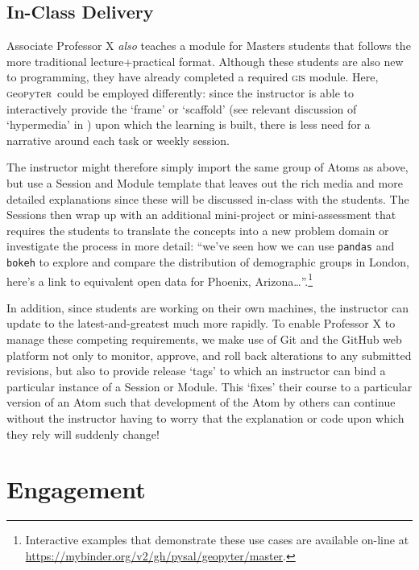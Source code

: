 \documentclass[letter, 11pt,titlepage]{article}
\newcommand{\gp}{\textsc{g}eo\textsc{p}y\textsc{t}e\textsc{r}~\/}
\begin{document}
\subsection{In-Class Delivery}\label{in-class-delivery}

Associate Professor X \emph{also} teaches a module for Masters students that follows the more traditional lecture+practical format. Although these students are also new to programming, they have already completed a required \textsc{gis} module. Here, \gp could be employed differently: since the instructor is able to interactively provide the `frame' or `scaffold' (see relevant discussion of `hypermedia' in \citealp{Azevedo2008}) upon which the learning is built, there is less need for a narrative around each task or weekly session. 

The instructor might therefore simply import the same group of Atoms as above,
but use a Session and Module template that leaves out the rich media and more
detailed explanations since these will be discussed in-class with the students.
The Sessions then wrap up with an additional mini-project or mini-assessment
that requires the students to translate the concepts into a new problem domain
or investigate the process in more detail: ``we've seen how we can use
\texttt{pandas} and \texttt{bokeh} to explore and compare the distribution of
demographic groups in London, here's a link to equivalent open data for Phoenix,
Arizona\ldots{}''.\footnote{Interactive examples that demonstrate these use
  cases are available on-line at \url{https://mybinder.org/v2/gh/pysal/geopyter/master}.}

In addition, since students are working on their own machines, the instructor can update to the latest-and-greatest much more rapidly. To enable Professor X to manage these competing requirements, we make use of Git and the GitHub web platform not only to monitor, approve, and roll back alterations to any submitted revisions, but also to provide release `tags' to which an instructor can bind a particular instance of a Session or Module. This `fixes' their course to a particular version of an Atom such that development of the Atom by others can continue without the instructor having to worry that the explanation or code upon which they rely will suddenly change! 

\section{Engagement}\label{sec:engagement}
\end{document}
